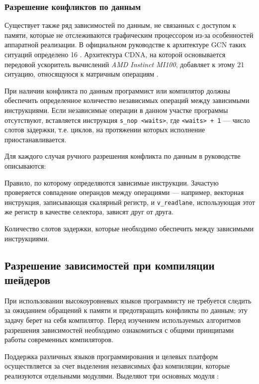 \documentclass[a4paper,14pt]{extarticle}
\begin{document}
{\subsubsection{Разрешение конфликтов по данным}
\label{section:gcn-wait-states}

Существует также ряд зависимостей по данным, не связанных с доступом к памяти,
которые не отслеживаются графическим процессором из-за особенностей аппаратной реализации.
В официальном руководстве к архитектуре GCN таких ситуаций определено 16 \cite[глава~4.5]{vega-isa}.
Архитектура CDNA, на которой основывается передовой ускоритель вычислений \textit{AMD Instinct MI100},
добавляет к этому 21 ситуацию, относящуюся к матричным операциям \cite[глава~7.2]{cdna-isa}.

При наличии конфликта по данным программист или компилятор должны обеспечить определенное
количество независимых операций между зависимыми инструкциями. Если независимые операции
в данном участке программы отсутствуют, вставляется инструкция \verb|s_nop <waits>|,
где \verb|<waits> + 1| — число слотов задержки, т.е. циклов, на протяжении которых
исполнение приостанавливается.

Для каждого случая ручного разрешения конфликта по данным в руководстве описываются:
\begin{ul}
\item Правило, по которому определяются зависимые инструкции. Зачастую проверяется
совпадение операндов между операциями — например, векторная инструкция,
записывающая скалярный регистр, и \verb|v_readlane|, использующая этот же
регистр в качестве селектора, зависят друг от друга.
\item Количество слотов задержки, которые необходимо обеспечить между зависимыми инструкциями.
\end{ul}

\subsection{Разрешение зависимостей при компиляции шейдеров}

При использовании высокоуровневых языков программисту не требуется следить
за ожиданием обращений к памяти и предотвращать конфликты по данным;
эту задачу берет на себя компилятор. Перед изучением используемых алгоритмов
разрешения зависимостей необходимо ознакомиться с общими принципами работы
современных компиляторов.

Поддержка различных языков программирования и целевых платформ осуществляется
за счет выделения независимых фаз компиляции, которые реализуются отдельными модулями.
Выделяют три основных модуля \cite[глава~1]{compilers}:

}
\end{document}
